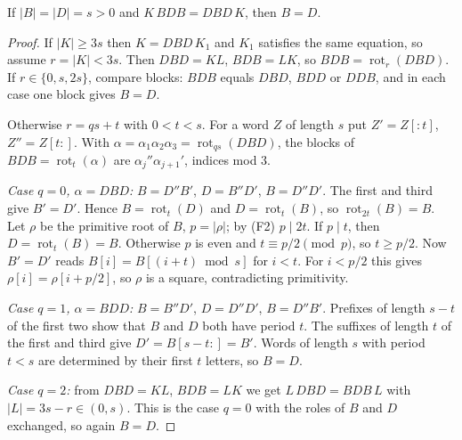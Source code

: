 \begin{lemma}\label{lemC}
If \(|B|=|D|=s>0\) and \(K\,BDB=DBD\,K\), then \(B=D\).
\end{lemma}
\begin{proof}
If \(|K|\ge3s\) then \(K=DBD\,K_1\) and \(K_1\) satisfies the same equation, so assume \(r=|K|<3s\). Then \(DBD=KL\), \(BDB=LK\), so \(BDB=\operatorname{rot}_r(DBD)\). If \(r\in\{0,s,2s\}\), compare blocks: \(BDB\) equals \(DBD\), \(BDD\) or \(DDB\), and in each case one block gives \(B=D\).

Otherwise \(r=qs+t\) with \(0<t<s\). For a word \(Z\) of length \(s\) put \(Z'=Z[{:}t]\), \(Z''=Z[t{:}]\). With \(\alpha=\alpha_1\alpha_2\alpha_3=\operatorname{rot}_{qs}(DBD)\), the blocks of \(BDB=\operatorname{rot}_t(\alpha)\) are \(\alpha_j''\alpha_{j+1}'\), indices mod 3.

\emph{Case \(q=0\), \(\alpha=DBD\):} \(B=D''B'\), \(D=B''D'\), \(B=D''D'\). The first and third give \(B'=D'\). Hence \(B=\operatorname{rot}_t(D)\) and \(D=\operatorname{rot}_t(B)\), so \(\operatorname{rot}_{2t}(B)=B\). Let \(\rho\) be the primitive root of \(B\), \(p=|\rho|\); by (F2) \(p\mid 2t\). If \(p\mid t\), then \(D=\operatorname{rot}_t(B)=B\). Otherwise \(p\) is even and \(t\equiv p/2\pmod p\), so \(t\ge p/2\). Now \(B'=D'\) reads \(B[i]=B[(i+t)\bmod s]\) for \(i<t\). For \(i<p/2\) this gives \(\rho[i]=\rho[i+p/2]\), so \(\rho\) is a square, contradicting primitivity.

\emph{Case \(q=1\), \(\alpha=BDD\):} \(B=B''D'\), \(D=D''D'\), \(B=D''B'\). Prefixes of length \(s-t\) of the first two show that \(B\) and \(D\) both have period \(t\). The suffixes of length \(t\) of the first and third give \(D'=B[s-t{:}]=B'\). Words of length \(s\) with period \(t<s\) are determined by their first \(t\) letters, so \(B=D\).

\emph{Case \(q=2\):} from \(DBD=KL\), \(BDB=LK\) we get \(L\,DBD=BDB\,L\) with \(|L|=3s-r\in(0,s)\). This is the case \(q=0\) with the roles of \(B\) and \(D\) exchanged, so again \(B=D\).
\end{proof}

